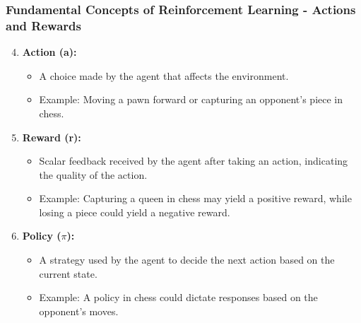 \documentclass[aspectratio=169]{beamer}
\begin{document}
\begin{frame}[fragile]
    \frametitle{Fundamental Concepts of Reinforcement Learning - Actions and Rewards}
    \begin{enumerate}
        \setcounter{enumi}{3} %
        
        \item \textbf{Action (a):}
        \begin{itemize}
            \item A choice made by the agent that affects the environment.
            \item Example: Moving a pawn forward or capturing an opponent's piece in chess.
        \end{itemize}

        \item \textbf{Reward (r):}
        \begin{itemize}
            \item Scalar feedback received by the agent after taking an action, indicating the quality of the action.
            \item Example: Capturing a queen in chess may yield a positive reward, while losing a piece could yield a negative reward.
        \end{itemize}

        \item \textbf{Policy ($\pi$):}
        \begin{itemize}
            \item A strategy used by the agent to decide the next action based on the current state.
            \item Example: A policy in chess could dictate responses based on the opponent's moves.
        \end{itemize}
    \end{enumerate}
\end{frame}
\end{document}
